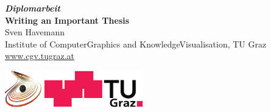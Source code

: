 \documentclass[10pt,a4paper,onecolumn]{book}
\newcommand{\wwwLink}[1]{\href{http://#1}{\textsf{#1}}}
\begin{document}
\frontmatter

\begin{titlepage}
\begin{center}
\vspace*{30mm}\Large

\textbf{\textit{Diplomarbeit}}\\[12mm]

\textbf{\textsf{\huge Writing an Important Thesis}}\\[12mm]

Sven Havemann \\[6pt]
Institute of ComputerGraphics and KnowledgeVisualisation, TU Graz\\[6pt]
\wwwLink{www.cgv.tugraz.at}

\vspace*{\fill}

\includegraphics[height=16mm]{cgv-logo} \quad
\includegraphics[height=16mm]{tug-logo}
\end{center}
\end{titlepage}

\tableofcontents

\mainmatter











\listoftables
{}
\listoffigures
{}
\twocolumn
\printindex
\end{document}
